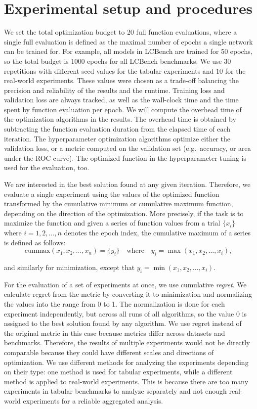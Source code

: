 \section{Experimental setup and procedures}
We set the total optimization budget to 20 full function evaluations, where a single full evaluation is defined as the maximal number of epochs a single network can be trained for. For example, all models in LCBench are trained for 50 epochs, so the total budget is 1000 epochs for all LCBench benchmarks. We use 30 repetitions with different seed values for the tabular experiments and 10 for the real-world experiments. These values were chosen as a trade-off balancing the precision and reliability of the results and the runtime. Training loss and validation loss are always tracked, as well as the wall-clock time and the time spent by function evaluation per epoch. We will compute the overhead time of the optimization algorithms in the results. The overhead time is obtained by subtracting the function evaluation duration from the elapsed time of each iteration. The hyperparameter optimization algorithms optimize either the validation loss, or a metric computed on the validation set (e.g.\ accuracy, or area under the ROC curve). The optimized function in the hyperparameter tuning is used for the evaluation, too.

We are interested in the best solution found at any given iteration. Therefore, we evaluate a single experiment using the values of the optimized function transformed by the cumulative minimum or cumulative maximum function, depending on the direction of the optimization. More precisely, if the task is to maximize the function and given a series of function values from a trial \( \{x_i\} \) where \( i = 1, 2, \ldots, n \) denotes the epoch index, the cumulative maximum of a series is defined as follows:
\[
\text{cummax}(x_1, x_2, \ldots, x_n) = \{y_i\} \quad \text{where} \quad y_i = \max(x_1, x_2, \ldots, x_i),
\]

\noindent
and similarly for minimization, except that $y_i = \min(x_1, x_2, \ldots, x_i)$.

For the evaluation of a set of experiments at once, we use cumulative \textit{regret}. We calculate regret from the metric by converting it to minimization and normalizing the values into the range from 0 to 1. The normalization is done for each experiment independently, but across all runs of all algorithms, so the value 0 is assigned to the best solution found by any algorithm. We use regret instead of the original metric in this case because metrics differ across datasets and benchmarks. Therefore, the results of multiple experiments would not be directly comparable because they could have different scales and directions of optimization. We use different methods for analyzing the experiments depending on their type: one method is used for tabular experiments, while a different method is applied to real-world experiments. This is because there are too many experiments in tabular benchmarks to analyze separately and not enough real-world experiments for a reliable aggregated analysis.

